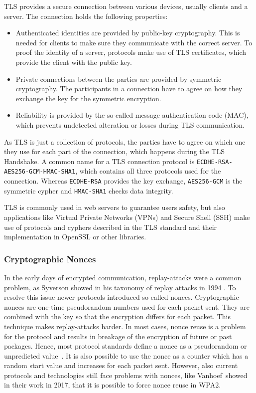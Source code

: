 TLS provides a secure connection between various devices, usually clients and a
server. The connection holds the following properties:
\begin{itemize}
  \item Authenticated identities are provided by public-key cryptography. This
is needed for clients to make sure they communicate with the correct server. To
proof the identity of a server, protocols make use of TLS certificates, which
provide the client with the public key.
  \item Private connections between the parties are provided by symmetric
cryptography. The participants in a connection have to agree on how they
exchange the key for the symmetric encryption.
  \item Reliability is provided by the so-called message authentication code
(MAC), which prevents undetected alteration or losses during TLS communication.
\end{itemize}

As TLS is just a collection of protocols, the parties have to agree on which one
they use for each part of the connection, which happens during the TLS
Handshake. A common name for a TLS connection protocol is
\texttt{ECDHE-RSA-AES256-GCM-HMAC-SHA1}, which contains all three protocols used
for the connection. Whereas \texttt{ECDHE-RSA} provides the key exchange,
\texttt{AES256-GCM} is the  symmetric cypher and \texttt{HMAC-SHA1} checks data
integrity.

TLS is commonly used in web servers to guarantee user\textquotesingle s safety,
but also applications like Virtual Private Networks (VPNs) and Secure Shell
(SSH) make use of protocols and cyphers described in the TLS standard and their
implementation in OpenSSL\cite{opensslweb} or other libraries.

\subsubsection{Cryptographic Nonces}

In the early days of encrypted communication, replay-attacks were a common
problem, as Syverson showed in his taxonomy of replay attacks in 1994
\cite{replaytax}. To resolve this issue newer protocols introduced so-called
nonces. Cryptographic nonces are one-time pseudorandom numbers used for each
packet sent. They are combined with the key so that the encryption differs for
each packet. This technique makes replay-attacks harder. In most cases, nonce
reuse is a problem for the protocol and results in breakage of the encryption of
future or past packages. Hence, most protocol standards define a nonce as a
pseudorandom or unpredicted value~\cite{noncegeneral}. It is also possible to
use the nonce as a counter which has a random start value and increases for each
packet sent. However, also current protocols and technologies still face
problems with nonces, like Vanhoef~\etal showed in their work in 2017, that it
is possible to force nonce reuse in WPA2\cite{wpanoncereuse}.

